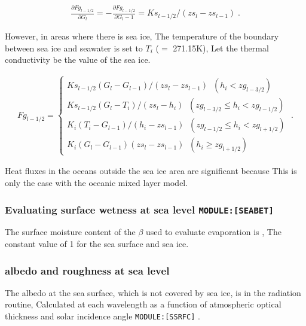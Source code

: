 \begin{eqnarray}
  \frac{\partial Fg_{l-1/2}}{\partial G_l} = - \frac{\partial Fg_{l-1/2}}{\partial G_l-1} 
 = Ks_{l-1/2}/(zs_l - zs_{l-1}) \; .
\end{eqnarray}

However, in areas where there is sea ice, The temperature of the
boundary between sea ice and seawater is set to \(T_i\) (\(=\) 271.15K),
Let the thermal conductivity be the value of the sea ice.

\begin{eqnarray}
  Fg_{l-1/2}  = \left\{ 
    \begin{array}{ll}
      Ks_{l-1/2} (G_l - G_{l-1})/(zs_l - zs_{l-1}) \;\; 
               (h_i < zg_{l-3/2} ) \\
      Ks_{l-1/2} (G_l - T_i)/(zs_l - h_i) \;\; 
               ( zg_{l-3/2} \le h_i < zg_{l-1/2} )\\
      K_i (T_i - G_{l-1})/(h_i - zs_{l-1}) \;\; 
               ( zg_{l-1/2} \le h_i < zg_{l+1/2} )\\
      K_i (G_l - G_{l-1})(zs_l - zs_{l-1}) \;\; 
               (h_i \ge zg_{l+1/2} )
    \end{array} 
    \right. \; .
\end{eqnarray}

Heat fluxes in the oceans outside the sea ice area are significant
because This is only the case with the oceanic mixed layer model.

\hypertarget{evaluating-surface-wetness-at-sea-level-moduleseabet}{%
\subsubsection{\texorpdfstring{Evaluating surface wetness at sea level
\texttt{MODULE:{[}SEABET{]}}}{Evaluating surface wetness at sea level MODULE:{[}SEABET{]}}}\label{evaluating-surface-wetness-at-sea-level-moduleseabet}}

The surface moisture content of the \(\beta\) used to evaluate
evaporation is , The constant value of 1 for the sea surface and sea
ice.

\hypertarget{albedo-and-roughness-at-sea-level}{%
\subsubsection{albedo and roughness at sea
level}\label{albedo-and-roughness-at-sea-level}}

The albedo at the sea surface, which is not covered by sea ice, is in
the radiation routine, Calculated at each wavelength as a function of
atmospheric optical thickness and solar incidence angle
\texttt{MODULE:{[}SSRFC{]}} .

